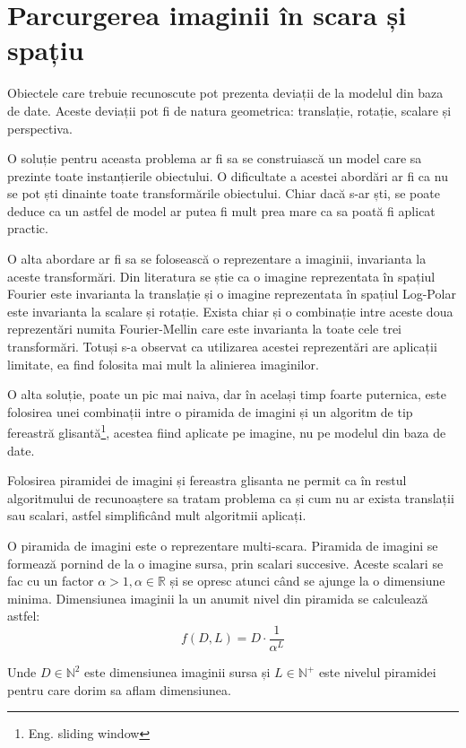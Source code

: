 \pagebreak
\section{Parcurgerea imaginii în scara și spațiu}

Obiectele care trebuie recunoscute pot prezenta deviații de la modelul din baza de date.
Aceste deviații pot fi de natura geometrica: translație, rotație, scalare și perspectiva.

O soluție pentru aceasta problema ar fi sa se construiască un model care sa prezinte toate instanțierile obiectului.
O dificultate a acestei abordări ar fi ca nu se pot ști dinainte toate transformările obiectului.
Chiar dacă s-ar ști, se poate deduce ca un astfel de model ar putea fi mult prea mare ca sa poată fi aplicat practic.

O alta abordare ar fi sa se folosească o reprezentare a imaginii, invarianta la aceste transformări.
Din literatura se știe ca o imagine reprezentata în spațiul Fourier este invarianta la translație și o imagine reprezentata în spațiul Log-Polar este invarianta la scalare și rotație.\cite{treiber2010introduction}
Exista chiar și o combinație intre aceste doua reprezentări numita Fourier-Mellin care este invarianta la toate cele trei transformări.
Totuși s-a observat ca utilizarea acestei reprezentări are aplicații limitate, ea find folosita mai mult la alinierea imaginilor.\cite{treiber2010introduction}

O alta soluție, poate un pic mai naiva, dar în același timp foarte puternica, este folosirea unei combinații intre o piramida de imagini și un algoritm de tip fereastră glisantă\footnote{Eng. sliding window}, acestea fiind aplicate pe imagine, nu pe modelul din baza de date.

Folosirea piramidei de imagini și fereastra glisanta ne permit ca în restul algoritmului de recunoaștere sa tratam problema ca și cum nu ar exista translații sau scalari, astfel simplificând mult algoritmii aplicați.

O piramida de imagini este o reprezentare multi-scara.
Piramida de imagini se formează pornind de la o imagine sursa, prin scalari succesive.
Aceste scalari se fac cu un factor ${\alpha > 1, \alpha \in \mathbb{R}}$ și se opresc atunci când se ajunge la o dimensiune minima.
Dimensiunea imaginii la un anumit nivel din piramida se calculează astfel:
$${
f(D,L) = D \cdot \frac{1}{\alpha^L}
}$$

Unde ${D \in \mathbb{N}^2}$ este dimensiunea imaginii sursa și ${L \in \mathbb{N}^+}$ este nivelul piramidei pentru care dorim sa aflam dimensiunea.

